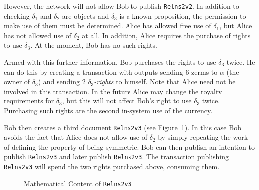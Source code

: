 \documentclass{article}
\begin{document}
However, the network will not allow Bob to publish {\tt{Relns2v2}}.
In addition to checking $\delta_1$ and $\delta_2$ are objects and $\delta_3$ is a known proposition,
the permission to make use of them must be determined.
Alice has allowed free use of $\delta_1$, but Alice has not allowed use of $\delta_2$ at all.
In addition, Alice requires the purchase of rights to use $\delta_3$.
At the moment, Bob has no such rights.

Armed with this further information, Bob purchases the rights to use $\delta_3$ twice.
He can do this by creating a transaction
with outputs
sending $6$ zerms to $\alpha$ (the owner of $\delta_3$) and
sending $2$ {\em{$\delta_3$-rights}} to himself.
Note that Alice need not be involved in this transaction.
In the future Alice may change the royalty requirements for $\delta_3$,
but this will not affect Bob's right to use $\delta_3$ twice.
Purchasing such rights are the second in-system use of the currency.

Bob then creates a third document {\tt{Relns2v3}} (see Figure~\ref{fig:docrelns2v3}).
In this case Bob avoids the fact that Alice does not allow use of $\delta_2$ by
simply repeating the work of defining the property of being symmetric.
Bob can then publish an intention to publish {\tt{Relns2v3}}
and later publish {\tt{Relns2v3}}.
The transaction publishing {\tt{Relns2v3}}
will spend the two rights purchased above, consuming them.

\begin{figure}
\begin{center}
\end{center}
\caption{Mathematical Content of {\tt{Relns2v3}}}
\label{fig:docrelns2v3}
\end{figure}
\end{document}
